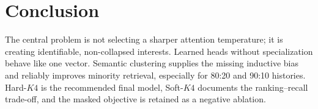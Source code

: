 \section{Conclusion}
The central problem is not selecting a sharper attention temperature; it is creating identifiable, non-collapsed interests. Learned heads without specialization behave like one vector. Semantic clustering supplies the missing inductive bias and reliably improves minority retrieval, especially for 80:20 and 90:10 histories. Hard-$K4$ is the recommended final model, Soft-$K4$ documents the ranking--recall trade-off, and the masked objective is retained as a negative ablation.




